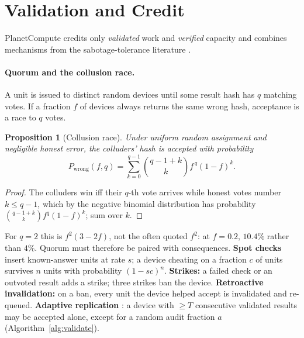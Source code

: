 \documentclass[11pt,a4paper]{article}
\theoremstyle{definition}
\theoremstyle{plain}
\newtheorem{proposition}{Proposition}[section]
\begin{document}
\section{Validation and Credit}\label{sec:verify}

PlanetCompute credits only \emph{validated} work and \emph{verified} capacity and combines mechanisms from the sabotage-tolerance
literature \citep{sarmenta2002sabotage,anderson2020boinc}.

\paragraph{Quorum and the collusion race.} A unit is issued to distinct random devices until some result hash
has $q$ matching votes. If a fraction $f$ of devices always returns the same wrong hash, acceptance is a race to
$q$ votes.

\begin{proposition}[Collusion race]\label{prop:race}
Under uniform random assignment and negligible honest error, the colluders' hash is accepted with probability
\begin{equation}\label{eq:race}
P_{\text{wrong}}(f,q)=\sum_{k=0}^{q-1}\binom{q-1+k}{k}f^{\,q}(1-f)^{k}.
\end{equation}
\end{proposition}
\begin{proof}
The colluders win iff their $q$-th vote arrives while honest votes number $k\le q-1$, which by the negative
binomial distribution has probability $\binom{q-1+k}{k}f^{q}(1-f)^{k}$; sum over $k$.
\end{proof}

\noindent For $q=2$ this is $f^2(3-2f)$, not the often quoted $f^2$: at $f=0.2$, $10.4\%$ rather than $4\%$.
Quorum must therefore be paired with consequences. \textbf{Spot checks} insert known-answer units at rate $s$;
a device cheating on a fraction $c$ of units survives $n$ units with probability $(1-sc)^n$.
\textbf{Strikes:} a failed check or an outvoted result adds a strike; three strikes ban the device.
\textbf{Retroactive invalidation:} on a ban, every unit the device helped accept is invalidated and re-queued.
\textbf{Adaptive replication} \citep{anderson2020boinc}: a device with $\ge T$ consecutive validated results may
be accepted alone, except for a random audit fraction $a$ (Algorithm~\ref{alg:validate}).
\end{document}
